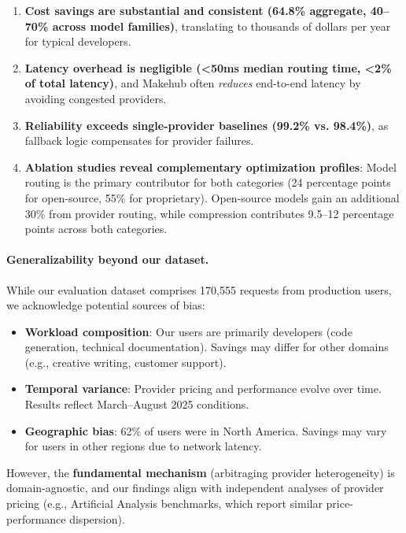\documentclass[english]{article}
\begin{document}
\begin{enumerate}
\item \textbf{Cost savings are substantial and consistent (64.8\% aggregate, 40--70\% across model families)}, translating to thousands of dollars per year for typical developers.

\item \textbf{Latency overhead is negligible (<50ms median routing time, <2\% of total latency)}, and Makehub often \emph{reduces} end-to-end latency by avoiding congested providers.

\item \textbf{Reliability exceeds single-provider baselines (99.2\% vs. 98.4\%)}, as fallback logic compensates for provider failures.

\item \textbf{Ablation studies reveal complementary optimization profiles}: Model routing is the primary contributor for both categories (24 percentage points for open-source, 55\% for proprietary). Open-source models gain an additional 30\% from provider routing, while compression contributes 9.5--12 percentage points across both categories.
\end{enumerate}

\paragraph{Generalizability beyond our dataset.}

While our evaluation dataset comprises 170,555 requests from production users, we acknowledge potential sources of bias:
\begin{itemize}
    \item \textbf{Workload composition}: Our users are primarily developers (code generation, technical documentation). Savings may differ for other domains (e.g., creative writing, customer support).
    \item \textbf{Temporal variance}: Provider pricing and performance evolve over time. Results reflect March--August 2025 conditions.
    \item \textbf{Geographic bias}: 62\% of users were in North America. Savings may vary for users in other regions due to network latency.
\end{itemize}

However, the \textbf{fundamental mechanism} (arbitraging provider heterogeneity) is domain-agnostic, and our findings align with independent analyses of provider pricing (e.g., Artificial Analysis benchmarks, which report similar price-performance dispersion).
\end{document}
